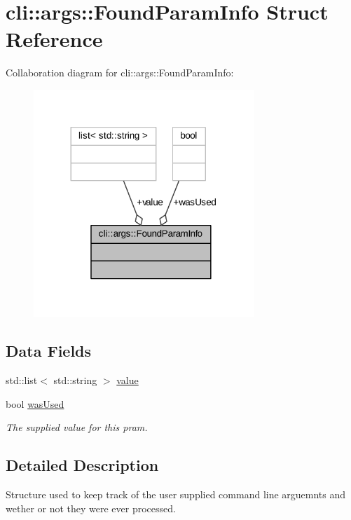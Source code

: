 \hypertarget{structcli_1_1args_1_1_found_param_info}{}\section{cli\+:\+:args\+:\+:Found\+Param\+Info Struct Reference}
\label{structcli_1_1args_1_1_found_param_info}


Collaboration diagram for cli\+:\+:args\+:\+:Found\+Param\+Info\+:
\nopagebreak
\begin{figure}[H]
\begin{center}
\leavevmode
\includegraphics[width=236pt]{structcli_1_1args_1_1_found_param_info__coll__graph}
\end{center}
\end{figure}
\subsection*{Data Fields}
\begin{DoxyCompactItemize}
\item 
std\+::list$<$ std\+::string $>$ \hyperlink{structcli_1_1args_1_1_found_param_info_a442cf495af35be19f31e08aac4265582}{value}
\item 
bool \hyperlink{structcli_1_1args_1_1_found_param_info_ae812e073354373c73b15032188b0653b}{was\+Used}
\begin{DoxyCompactList}\small\item\em The supplied value for this pram. \end{DoxyCompactList}\end{DoxyCompactItemize}


\subsection{Detailed Description}
Structure used to keep track of the user supplied command line arguemnts and wether or not they were ever processed. 

